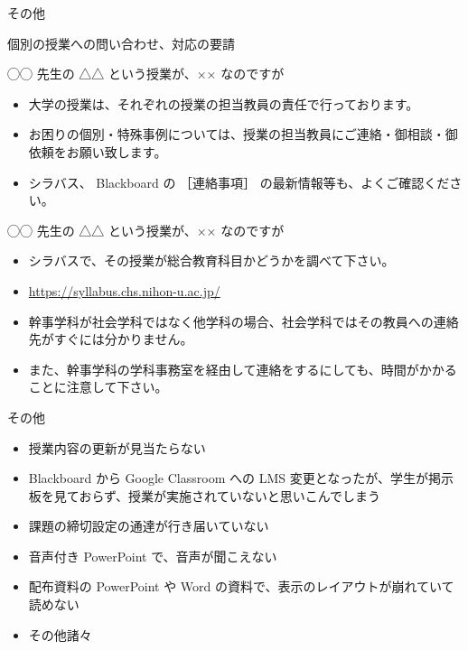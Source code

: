 \documentclass[a4j,10pt]{jsarticle}
\def\lthtmlcheckvsize{\ifdim\ht\sizebox<\vsize 
  \ifdim\wd\sizebox<\hsize\expandafter\hfill\fi \expandafter\vfill
  \else\expandafter\vss\fi}%
\begin{document}
{\newpage\clearpage
{}%
\begin{frame}[label={sec:org418bc5d},fragile]{その他}
\begin{block}{個別の授業への問い合わせ、対応の要請}
\begin{block}{◯◯ 先生の △△ という授業が、×× なのですが}
\begin{itemize}
\item 大学の授業は、それぞれの授業の担当教員の責任で行っております。
\item お困りの個別・特殊事例については、授業の担当教員にご連絡・御相談・御依頼をお願い致します。
\item シラバス、 Blackboard の ［連絡事項］ の最新情報等も、よくご確認ください。
\end{itemize}
\end{block}
\par
\begin{block}{◯◯ 先生の △△ という授業が、×× なのですが}
\begin{itemize}
\item シラバスで、その授業が総合教育科目かどうかを調べて下さい。
\item \url{https://syllabus.chs.nihon-u.ac.jp/}
\item 幹事学科が社会学科ではなく他学科の場合、社会学科ではその教員への連絡先がすぐには分かりません。
\item また、幹事学科の学科事務室を経由して連絡をするにしても、時間がかかることに注意して下さい。
\end{itemize}
\end{block}
\par
\begin{block}{その他}
\begin{itemize}
\item 授業内容の更新が見当たらない
\item Blackboard から Google Classroom への LMS 変更となったが、学生が掲示板を見ておらず、授業が実施されていないと思いこんでしまう
\item 課題の締切設定の通達が行き届いていない
\item 音声付き PowerPoint で、音声が聞こえない
\item 配布資料の PowerPoint や Word の資料で、表示のレイアウトが崩れていて読めない
\item その他諸々
\end{itemize}
\end{block}
\end{block}
\end{frame}%
\lthtmlfigureZ
\lthtmlcheckvsize\clearpage}
\end{document}
